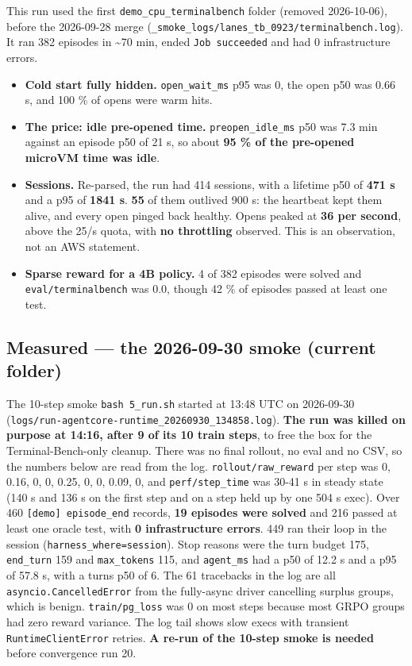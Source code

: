 \documentclass[
  paper=a4,
  ,captions=tableheading
]{scrartcl}
\providecommand{\tightlist}{%
  \setlength{\itemsep}{0pt}\setlength{\parskip}{0pt}}
\begin{document}
This run used the first \texttt{demo\_cpu\_terminalbench} folder
(removed 2026-10-06), before the 2026-09-28 merge
(\texttt{\_smoke\_logs/lanes\_tb\_0923/terminalbench.log}). It ran 382
episodes in \textasciitilde70 min, ended \texttt{Job\ succeeded} and had
0 infrastructure errors.

\begin{itemize}
\tightlist
\item
  \textbf{Cold start fully hidden.} \texttt{open\_wait\_ms} p95 was 0,
  the open p50 was 0.66 s, and 100 \% of opens were warm hits.
\item
  \textbf{The price: idle pre-opened time.} \texttt{preopen\_idle\_ms}
  p50 was 7.3 min against an episode p50 of 21 s, so about \textbf{95 \%
  of the pre-opened microVM time was idle}.
\item
  \textbf{Sessions.} Re-parsed, the run had 414 sessions, with a
  lifetime p50 of \textbf{471 s} and a p95 of \textbf{1841 s}.
  \textbf{55} of them outlived 900 s: the heartbeat kept them alive, and
  every open pinged back healthy. Opens peaked at \textbf{36 per
  second}, above the 25/s quota, with \textbf{no throttling} observed.
  This is an observation, not an AWS statement.
\item
  \textbf{Sparse reward for a 4B policy.} 4 of 382 episodes were solved
  and \texttt{eval/terminalbench} was 0.0, though 42 \% of episodes
  passed at least one test.
\end{itemize}

\hypertarget{measured-the-2026-09-30-smoke-current-folder}{%
\subsection{Measured --- the 2026-09-30 smoke (current
folder)}\label{measured-the-2026-09-30-smoke-current-folder}}

The 10-step smoke \texttt{bash\ 5\_run.sh} started at 13:48 UTC on
2026-09-30 (\texttt{logs/run-agentcore-runtime\_20260930\_134858.log}).
\textbf{The run was killed on purpose at 14:16, after 9 of its 10 train
steps}, to free the box for the Terminal-Bench-only cleanup. There was
no final rollout, no eval and no CSV, so the numbers below are read from
the log. \texttt{rollout/raw\_reward} per step was 0, 0.16, 0, 0, 0.25,
0, 0, 0.09, 0, and \texttt{perf/step\_time} was 30-41 s in steady state
(140 s and 136 s on the first step and on a step held up by one 504 s
exec). Over 460 \texttt{{[}demo{]}\ episode\_end} records, \textbf{19
episodes were solved} and 216 passed at least one oracle test, with
\textbf{0 infrastructure errors}. 449 ran their loop in the session
(\texttt{harness\_where=session}). Stop reasons were the turn budget
175, \texttt{end\_turn} 159 and \texttt{max\_tokens} 115, and
\texttt{agent\_ms} had a p50 of 12.2 s and a p95 of 57.8 s, with a turns
p50 of 6. The 61 tracebacks in the log are all
\texttt{asyncio.CancelledError} from the fully-async driver cancelling
surplus groups, which is benign. \texttt{train/pg\_loss} was 0 on most
steps because most GRPO groups had zero reward variance. The log tail
shows slow execs with transient \texttt{RuntimeClientError} retries.
\textbf{A re-run of the 10-step smoke is needed} before convergence run
20.
\end{document}
